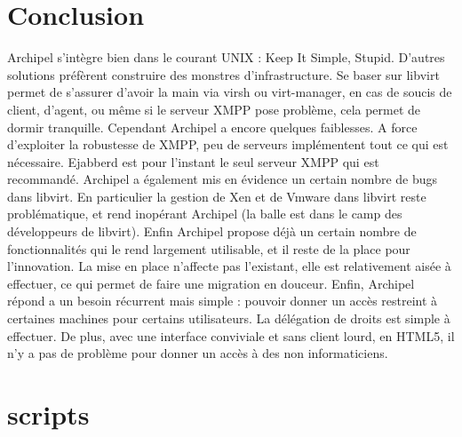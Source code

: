     \section{Conclusion}
Archipel s'intègre bien dans le courant UNIX : Keep It Simple, Stupid. D'autres solutions préfèrent
construire des monstres d'infrastructure. Se baser sur libvirt permet de s'assurer d'avoir la main via virsh
ou virt-manager, en cas de soucis de client, d'agent, ou même si le serveur XMPP pose problème, cela
permet de dormir tranquille.\newline
Cependant Archipel a encore quelques faiblesses. A force d'exploiter la robustesse de XMPP, peu de
serveurs implémentent tout ce qui est nécessaire. Ejabberd est pour l'instant le seul serveur XMPP qui est
recommandé. Archipel a également mis en évidence un certain nombre de bugs dans libvirt. En particulier
la gestion de Xen et de Vmware dans libvirt reste problématique, et rend inopérant Archipel (la balle est
dans le camp des développeurs de libvirt). Enfin Archipel propose déjà un certain nombre de
fonctionnalités qui le rend largement utilisable, et il reste de la place pour l'innovation.\newline
La mise en place n'affecte pas l'existant, elle est relativement aisée à effectuer, ce qui permet de faire
une migration en douceur.\newline
Enfin, Archipel répond a un besoin récurrent mais simple : pouvoir donner un accès restreint à certaines
machines pour certains utilisateurs. La délégation de droits est simple à effectuer. De plus, avec une
interface conviviale et sans client lourd, en HTML5, il n'y a pas de problème pour donner un accès à des
non informaticiens.

\section{scripts}

\newpage

     
